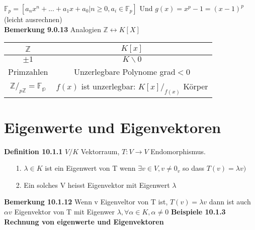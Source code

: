 \documentclass{article}
\begin{document}
$\mathbb{F}_p=[a_nx^n+...+a_1x+a_0|n\ge0,a_i\in\mathbb{F}_p]$ Und $g(x)=x^p-1=(x-1)^p$ (leicht ausrechnen)
\\\textbf{Bemerkung 9.0.13} Analogien $\mathbb{Z}\leftrightarrow K[X]$\newline
\begin{center}
\begin{tabular}{c|c}
	$\mathbb{Z}$&$K[x]$\\\hline
	$\pm1$&$K\backslash 0$\\
	Primzahlen&Unzerlegbare Polynome grad$<$0\\
	$\mathbb{Z}/_{p\mathbb{Z}}=\mathbb{F_p}$&$f(x)$ ist unzerlegbar: $K[x]/_{f(x)}$ Körper
\end{tabular}
\end{center}
\section{Eigenwerte und Eigenvektoren}
\textbf{Definition 10.1.1} $V/K$ Vektorraum, $T:V\rightarrow V$ Endomorphismus.
\begin{itemize}
\item[1.]$\lambda\in K$ ist ein Eigenwert von T wenn $\exists v\in V, v\neq 0_v$ so dass $T(v)=\lambda v)$
\item[2.]Ein solches V heisst Eigenvektor  mit Eigenwert $\lambda$
\end{itemize}
\textbf{Bemerkung 10.1.12} Wenn v Eigenveltor von T ist, $T(v)=\lambda v$ dann ist auch $\alpha v$ Eigenvektor von T mit Eigenwer $\lambda, \forall \alpha\in K, \alpha \neq0$\newline
\textbf{Beispiele 10.1.3 Rechnung von eigenwerte und Eigenvektoren}
\end{document}

